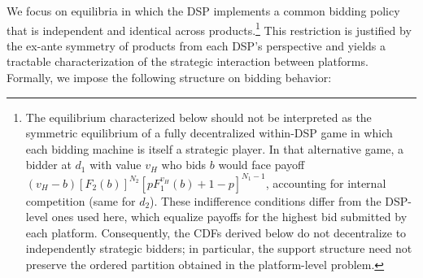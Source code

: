 \documentclass[11pt]{article}
\theoremstyle{plain}
\theoremstyle{definition}
\theoremstyle{plain}
\theoremstyle{plain}
\theoremstyle{plain}
\theoremstyle{plain}
\numberwithin{equation}{section}
\begin{document}
\vspace{0.2cm}

\noindent We focus on equilibria in which the DSP implements a common bidding policy that is independent and identical across products.\footnote{The equilibrium characterized below should not be interpreted as the symmetric equilibrium of a fully decentralized within-DSP game in which each bidding machine is itself a strategic player. In that alternative game, a bidder at $d_1$ with value $v_H$ who bids $b$ would face payoff $(v_H-b)[F_2(b)]^{N_2}[pF_1^{v_H}(b)+1-p]^{N_1-1}$, accounting for internal competition (same for $d_2$). These indifference conditions differ from the DSP-level ones used here, which equalize payoffs for the highest bid submitted by each platform. Consequently, the CDFs derived below do not decentralize to independently strategic bidders; in particular, the support structure need not preserve the ordered partition obtained in the platform-level problem.} This restriction is justified by the ex-ante symmetry of products from each DSP's perspective and yields a tractable characterization of the strategic interaction between platforms. Formally, we impose the following structure on bidding behavior:
\end{document}
